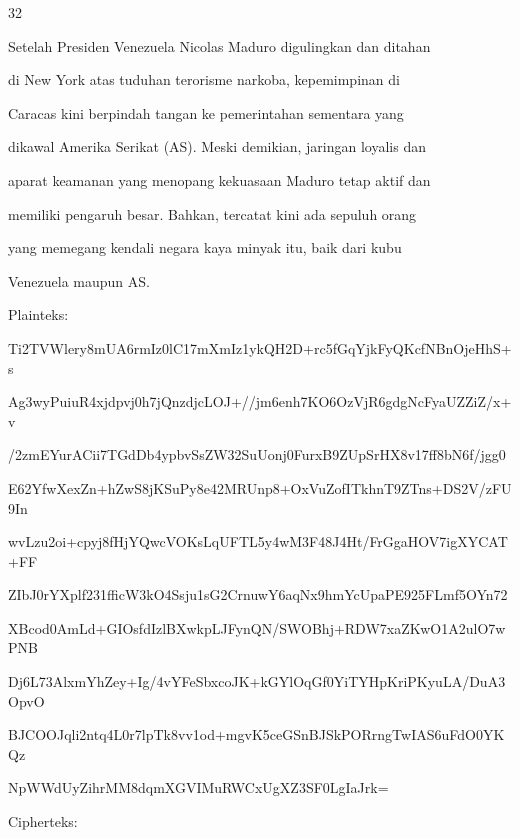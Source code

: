 \documentclass{article}
\begin{document}

32

Setelah Presiden Venezuela Nicolas Maduro digulingkan dan ditahan 

di New York atas tuduhan terorisme narkoba, kepemimpinan di 

Caracas kini berpindah tangan ke pemerintahan sementara yang 

dikawal Amerika Serikat (AS). Meski demikian, jaringan loyalis dan 

aparat keamanan yang menopang kekuasaan Maduro tetap aktif dan 

memiliki pengaruh besar. Bahkan, tercatat kini ada sepuluh orang 

yang memegang kendali negara kaya minyak itu, baik dari kubu 

Venezuela maupun AS.

Plainteks:

Ti2TVWlery8mUA6rmIz0lC17mXmIz1ykQH2D+rc5fGqYjkFyQKcfNBnOjeHhS+s

Ag3wyPuiuR4xjdpvj0h7jQnzdjcLOJ+//jm6enh7KO6OzVjR6gdgNcFyaUZZiZ/x+v

/2zmEYurACii7TGdDb4ypbvSsZW32SuUonj0FurxB9ZUpSrHX8v17ff8bN6f/jgg0

E62YfwXexZn+hZwS8jKSuPy8e42MRUnp8+OxVuZofITkhnT9ZTns+DS2V/zFU9In

wvLzu2oi+cpyj8fHjYQwcVOKsLqUFTL5y4wM3F48J4Ht/FrGgaHOV7igXYCAT+FF

ZIbJ0rYXplf231fficW3kO4Ssju1sG2CrnuwY6aqNx9hmYcUpaPE925FLmf5OYn72

XBcod0AmLd+GIOsfdIzlBXwkpLJFynQN/SWOBhj+RDW7xaZKwO1A2ulO7wPNB

Dj6L73AlxmYhZey+Ig/4vYFeSbxcoJK+kGYlOqGf0YiTYHpKriPKyuLA/DuA3OpvO

BJCOOJqli2ntq4L0r7lpTk8vv1od+mgvK5ceGSnBJSkPORrngTwIAS6uFdO0YKQz

NpWWdUyZihrMM8dqmXGVIMuRWCxUgXZ3SF0LgIaJrk=

Cipherteks:
\end{document}
